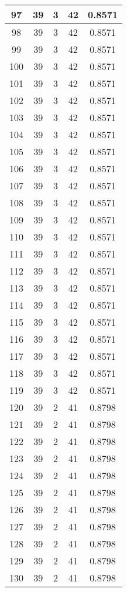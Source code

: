 \documentclass[letterpaper, 12pt]{article}
\begin{document}
\begin{longtable}{|c|c|c|c|c|}
\hline
97 & 39 & 3 & 42 & 0.8571 \\
\hline
98 & 39 & 3 & 42 & 0.8571 \\
\hline
99 & 39 & 3 & 42 & 0.8571 \\
\hline
100 & 39 & 3 & 42 & 0.8571 \\
\hline
101 & 39 & 3 & 42 & 0.8571 \\
\hline
102 & 39 & 3 & 42 & 0.8571 \\
\hline
103 & 39 & 3 & 42 & 0.8571 \\
\hline
104 & 39 & 3 & 42 & 0.8571 \\
\hline
105 & 39 & 3 & 42 & 0.8571 \\
\hline
106 & 39 & 3 & 42 & 0.8571 \\
\hline
107 & 39 & 3 & 42 & 0.8571 \\
\hline
108 & 39 & 3 & 42 & 0.8571 \\
\hline
109 & 39 & 3 & 42 & 0.8571 \\
\hline
110 & 39 & 3 & 42 & 0.8571 \\
\hline
111 & 39 & 3 & 42 & 0.8571 \\
\hline
112 & 39 & 3 & 42 & 0.8571 \\
\hline
113 & 39 & 3 & 42 & 0.8571 \\
\hline
114 & 39 & 3 & 42 & 0.8571 \\
\hline
115 & 39 & 3 & 42 & 0.8571 \\
\hline
116 & 39 & 3 & 42 & 0.8571 \\
\hline
117 & 39 & 3 & 42 & 0.8571 \\
\hline
118 & 39 & 3 & 42 & 0.8571 \\
\hline
119 & 39 & 3 & 42 & 0.8571 \\
\hline
120 & 39 & 2 & 41 & 0.8798 \\
\hline
121 & 39 & 2 & 41 & 0.8798 \\
\hline
122 & 39 & 2 & 41 & 0.8798 \\
\hline
123 & 39 & 2 & 41 & 0.8798 \\
\hline
124 & 39 & 2 & 41 & 0.8798 \\
\hline
125 & 39 & 2 & 41 & 0.8798 \\
\hline
126 & 39 & 2 & 41 & 0.8798 \\
\hline
127 & 39 & 2 & 41 & 0.8798 \\
\hline
128 & 39 & 2 & 41 & 0.8798 \\
\hline
129 & 39 & 2 & 41 & 0.8798 \\
\hline
130 & 39 & 2 & 41 & 0.8798 \\

\end{longtable}
\end{document}
